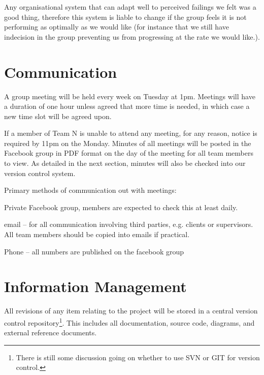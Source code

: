 \documentclass{l3deliverable}
\begin{document}
Any organisational system that can adapt well to perceived failings we felt was a good thing, therefore this system is liable to change if the group feels it is not performing as optimally as we would like (for instance that we still have indecision in the group preventing us from progressing at the rate we would like.).


\section{Communication}

A group meeting will be held every week on Tuesday at 1pm. Meetings will have a duration of one hour unless agreed that more time is needed, in which case a new time slot will be agreed upon.

If a member of Team N is unable to attend any meeting, for any reason, notice is required by 11pm on the Monday. Minutes of all meetings will be posted in the Facebook group in PDF format on the day of the meeting for all team members to view. As detailed in the next section, minutes will also be checked into our version control system.

Primary methods of communication out with meetings:
\begin{list}{}{}
\item Private Facebook group, members are expected to check this at least daily.
\item email -- for all communication involving third parties, e.g. clients or supervisors. All team members should be copied into emails if practical.
\item Phone -- all numbers are published on the facebook group
\end{list}


\section{Information Management}

All revisions of any item relating to the project will be stored in a central version control repository\footnote{There is still some discussion going on whether to use SVN or GIT for version control.}. This includes all documentation, source code, diagrams, and external reference documents.
\end{document}

